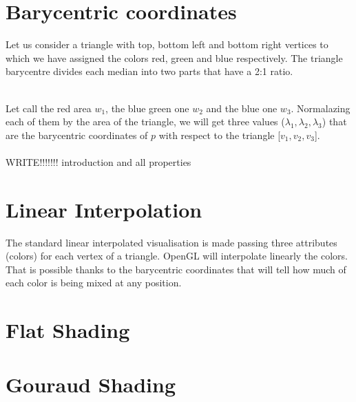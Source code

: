\section{Barycentric coordinates}
Let us consider a triangle with top, bottom left and bottom right vertices to which we have assigned the colors red, green and blue respectively. The triangle barycentre divides each median into two parts that have a 2:1 ratio. \\
    \\
    Let call the red area $w_1$, the blue green one $w_2$ and the blue one $w_3$. Normalazing each of them by the area of the triangle, we will get three values ($\lambda_1, \lambda_2, \lambda_3$) that are the barycentric coordinates of $p$ with respect to the triangle [$v_1, v_2, v_3$].
\\ \\ WRITE!!!!!!! introduction and all properties

\section{Linear Interpolation}
The standard linear interpolated visualisation is made passing three attributes (colors) for each vertex of a triangle. OpenGL will interpolate linearly the colors. That is possible thanks to the barycentric coordinates that will tell how much of each color is being mixed at any position.

\section{Flat Shading}

\section{Gouraud Shading}

